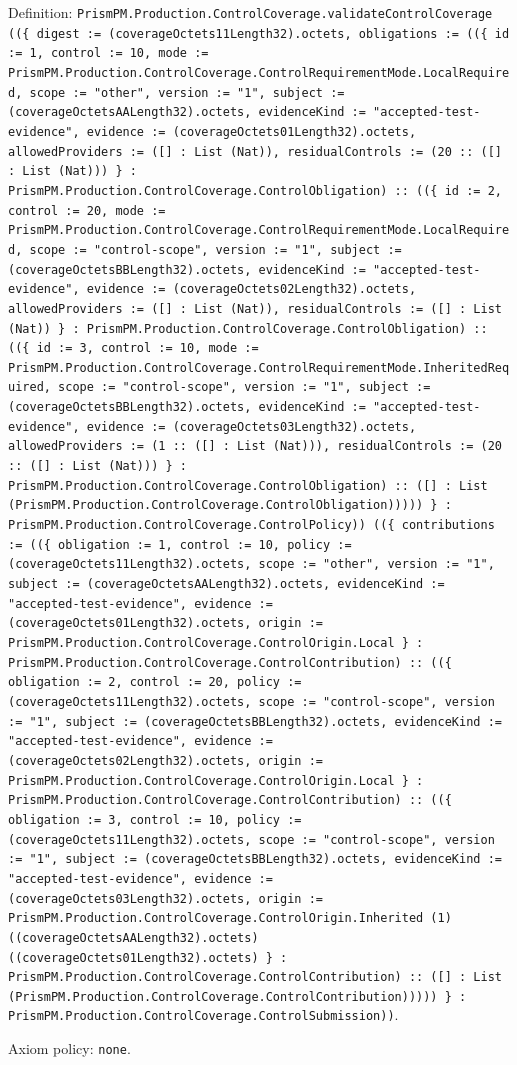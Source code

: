 \documentclass[11pt]{article}
\begin{document}
\noindent Definition: \texttt{PrismPM.Production.ControlCoverage.validateControlCoverage ((\{ digest := (coverageOctets11Length32).octets, obligations := ((\{ id := 1, control := 10, mode := PrismPM.Production.ControlCoverage.ControlRequirementMode.LocalRequired, scope := "other", version := "1", subject := (coverageOctetsAALength32).octets, evidenceKind := "accepted-test-evidence", evidence := (coverageOctets01Length32).octets, allowedProviders := ([] : List (Nat)), residualControls := (20 :: ([] : List (Nat))) \} : PrismPM.Production.ControlCoverage.ControlObligation) :: ((\{ id := 2, control := 20, mode := PrismPM.Production.ControlCoverage.ControlRequirementMode.LocalRequired, scope := "control-scope", version := "1", subject := (coverageOctetsBBLength32).octets, evidenceKind := "accepted-test-evidence", evidence := (coverageOctets02Length32).octets, allowedProviders := ([] : List (Nat)), residualControls := ([] : List (Nat)) \} : PrismPM.Production.ControlCoverage.ControlObligation) :: ((\{ id := 3, control := 10, mode := PrismPM.Production.ControlCoverage.ControlRequirementMode.InheritedRequired, scope := "control-scope", version := "1", subject := (coverageOctetsBBLength32).octets, evidenceKind := "accepted-test-evidence", evidence := (coverageOctets03Length32).octets, allowedProviders := (1 :: ([] : List (Nat))), residualControls := (20 :: ([] : List (Nat))) \} : PrismPM.Production.ControlCoverage.ControlObligation) :: ([] : List (PrismPM.Production.ControlCoverage.ControlObligation))))) \} : PrismPM.Production.ControlCoverage.ControlPolicy)) ((\{ contributions := ((\{ obligation := 1, control := 10, policy := (coverageOctets11Length32).octets, scope := "other", version := "1", subject := (coverageOctetsAALength32).octets, evidenceKind := "accepted-test-evidence", evidence := (coverageOctets01Length32).octets, origin := PrismPM.Production.ControlCoverage.ControlOrigin.Local \} : PrismPM.Production.ControlCoverage.ControlContribution) :: ((\{ obligation := 2, control := 20, policy := (coverageOctets11Length32).octets, scope := "control-scope", version := "1", subject := (coverageOctetsBBLength32).octets, evidenceKind := "accepted-test-evidence", evidence := (coverageOctets02Length32).octets, origin := PrismPM.Production.ControlCoverage.ControlOrigin.Local \} : PrismPM.Production.ControlCoverage.ControlContribution) :: ((\{ obligation := 3, control := 10, policy := (coverageOctets11Length32).octets, scope := "control-scope", version := "1", subject := (coverageOctetsBBLength32).octets, evidenceKind := "accepted-test-evidence", evidence := (coverageOctets03Length32).octets, origin := PrismPM.Production.ControlCoverage.ControlOrigin.Inherited (1) ((coverageOctetsAALength32).octets) ((coverageOctets01Length32).octets) \} : PrismPM.Production.ControlCoverage.ControlContribution) :: ([] : List (PrismPM.Production.ControlCoverage.ControlContribution))))) \} : PrismPM.Production.ControlCoverage.ControlSubmission))}.\par
\noindent Axiom policy: \texttt{none}.\par
\end{document}
